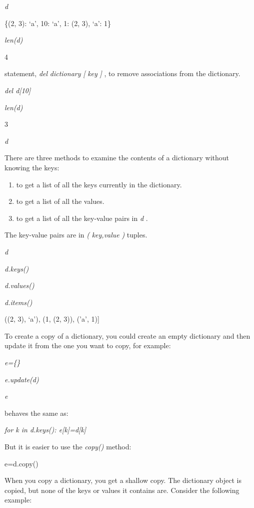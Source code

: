 \emph{d}

\{(2, 3): `a', 10: `a', 1: (2, 3),
`a': 1\}


\emph{len(d)}

4


statement, \emph{del} \emph{dictionary} \emph{{[}} \emph{key} \emph{{]}}
, to remove associations from the dictionary.


\emph{del d{[}10{]}}


\emph{len(d)}

3


\emph{d}



There are three methods to examine
the contents of a dictionary without knowing the keys:

\begin{enumerate}

\item
   to get a
  list of all the keys currently in the dictionary.
\item
   to get a
  list of all the values.
\item
   to get a
  list of all the key-value pairs in \emph{d} .
\end{enumerate}

The key-value pairs are in
\emph{(} \emph{key,value} \emph{)} tuples.


\emph{d}




\emph{d.keys()}




\emph{d.values()}




\emph{d.items()}

((2, 3), `a'), (1, (2, 3)),
('a', 1){]}

To create a copy of a dictionary,
you could create an empty dictionary and then update it from the one you
want to copy, for example:


\emph{e=\{\}}


\emph{e.update(d)}


\emph{e}




behaves the same as:


\emph{for k in d.keys(): e{[}k{]}=d{[}k{]}}

But it is easier to use the
\emph{copy()} method:

e=d.copy()

When you copy a dictionary, you
get a shallow copy. The dictionary object is copied, but none of the
keys or values it contains are. Consider the following example:


